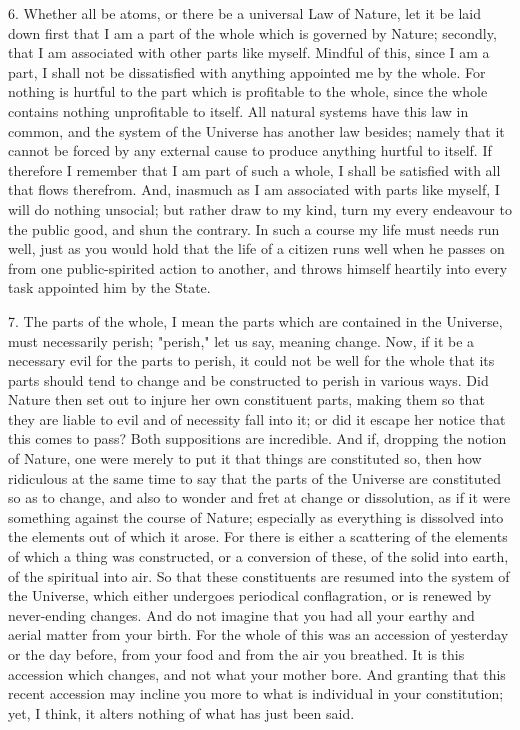 \documentclass{book}
\begin{document}
6. Whether all be atoms, or there be a universal Law of Nature, let it
be laid down first that I am a part of the whole which is governed by
Nature; secondly, that I am associated with other parts like
myself. Mindful of this, since I am a part, I shall not be
dissatisfied with anything appointed me by the whole. For nothing is
hurtful to the part which is profitable to the whole, since the whole
contains nothing unprofitable to itself. All natural systems have this
law in common, and the system of the Universe has another law besides;
namely that it cannot be forced by any external cause to produce
anything hurtful to itself. If therefore I remember that I am part of
such a whole, I shall be satisfied with all that flows therefrom. And,
inasmuch as I am associated with parts like myself, I will do nothing
unsocial; but rather draw to my kind, turn my every endeavour to the
public good, and shun the contrary. In such a course my life must
needs run well, just as you would hold that the life of a citizen runs
well when he passes on from one public-spirited action to another, and
throws himself heartily into every task appointed him by the State.

7. The parts of the whole, I mean the parts which are contained in the
Universe, must necessarily perish; "perish," let us say, meaning
change. Now, if it be a necessary evil for the parts to perish, it
could not be well for the whole that its parts should tend to change
and be constructed to perish in various ways. Did Nature then set out
to injure her own constituent parts, making them so that they are
liable to evil and of necessity fall into it; or did it escape her
notice that this comes to pass? Both suppositions are incredible. And
if, dropping the notion of Nature, one were merely to put it that
things are constituted so, then how ridiculous at the same time to say
that the parts of the Universe are constituted so as to change, and
also to wonder and fret at change or dissolution, as if it were
something against the course of Nature; especially as everything is
dissolved into the elements out of which it arose. For there is either
a scattering of the elements of which a thing was constructed, or a
conversion of these, of the solid into earth, of the spiritual into
air. So that these constituents are resumed into the system of the
Universe, which either undergoes periodical conflagration, or is
renewed by never-ending changes. And do not imagine that you had all
your earthy and aerial matter from your birth. For the whole of this
was an accession of yesterday or the day before, from your food and
from the air you breathed. It is this accession which changes, and not
what your mother bore. And granting that this recent accession may
incline you more to what is individual in your constitution; yet, I
think, it alters nothing of what has just been said.
\end{document}
